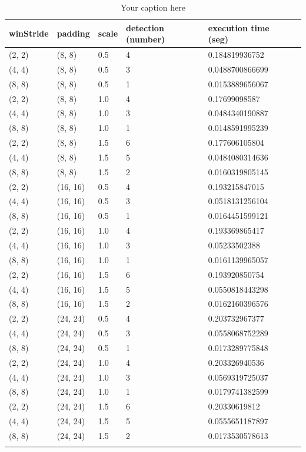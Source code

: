 \begin{longtable}{|l|l|l|l|l|l|} 
	\hline
	\textbf{winStride} & \textbf{padding} & \textbf{scale} & \textbf{detection (number)} & \textbf{execution time (seg)} \\ \hline
	(2, 2) & (8, 8) & 0.5 & 4 & 0.184819936752 \\ \hline
	(4, 4) & (8, 8) & 0.5 & 3 & 0.0488700866699 \\ \hline
	(8, 8) & (8, 8) & 0.5 & 1 & 0.0153889656067 \\ \hline
	(2, 2) & (8, 8) & 1.0 & 4 & 0.17699098587 \\ \hline
	(4, 4) & (8, 8) & 1.0 & 3 & 0.0484340190887 \\ \hline
	(8, 8) & (8, 8) & 1.0 & 1 & 0.0148591995239 \\ \hline
	(2, 2) & (8, 8) & 1.5 & 6 & 0.177606105804 \\ \hline
	(4, 4) & (8, 8) & 1.5 & 5 & 0.0484080314636 \\ \hline
	(8, 8) & (8, 8) & 1.5 & 2 & 0.0160319805145 \\ \hline
	(2, 2) & (16, 16) & 0.5 & 4 & 0.193215847015 \\ \hline
	(4, 4) & (16, 16) & 0.5 & 3 & 0.0518131256104 \\ \hline
	(8, 8) & (16, 16) & 0.5 & 1 & 0.0164451599121 \\ \hline
	(2, 2) & (16, 16) & 1.0 & 4 & 0.193369865417 \\ \hline
	(4, 4) & (16, 16) & 1.0 & 3 & 0.05233502388 \\ \hline
	(8, 8) & (16, 16) & 1.0 & 1 & 0.0161139965057 \\ \hline
	(2, 2) & (16, 16) & 1.5 & 6 & 0.193920850754 \\ \hline
	(4, 4) & (16, 16) & 1.5 & 5 & 0.0550818443298 \\ \hline
	(8, 8) & (16, 16) & 1.5 & 2 & 0.0162160396576 \\ \hline
	(2, 2) & (24, 24) & 0.5 & 4 & 0.203732967377 \\ \hline
	(4, 4) & (24, 24) & 0.5 & 3 & 0.0558068752289 \\ \hline
	(8, 8) & (24, 24) & 0.5 & 1 & 0.0173289775848 \\ \hline
	(2, 2) & (24, 24) & 1.0 & 4 & 0.203326940536 \\ \hline
	(4, 4) & (24, 24) & 1.0 & 3 & 0.0569319725037 \\ \hline
	(8, 8) & (24, 24) & 1.0 & 1 & 0.0179741382599 \\ \hline
	(2, 2) & (24, 24) & 1.5 & 6 & 0.20330619812 \\ \hline
	(4, 4) & (24, 24) & 1.5 & 5 & 0.0555651187897 \\ \hline
	(8, 8) & (24, 24) & 1.5 & 2 & 0.0173530578613 \\ \hline
	
		
	\caption{Your caption here} %
	\label{tab:myfirstlongtable}
\end{longtable}


